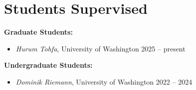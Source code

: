 \section{Students Supervised}

\textbf{Graduate Students:}
\begin{itemize}
    \item \textit{Hurum Tohfa}, University of Washington \hfill 2025 -- present
\end{itemize}

\textbf{Undergraduate Students:}
\begin{itemize}
    \item \textit{Dominik Riemann}, University of Washington \hfill 2022 -- 2024
\end{itemize}